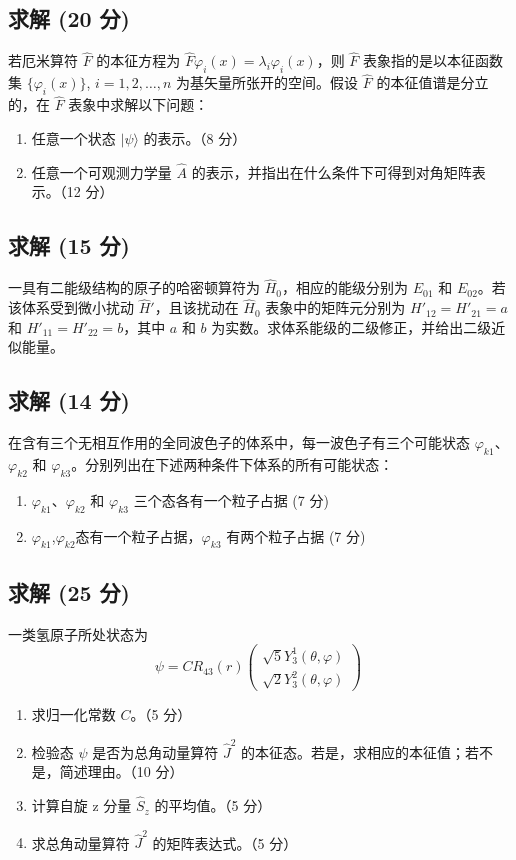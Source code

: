 \subsection{求解 (20 分)}
若厄米算符 $\hat{F}$ 的本征方程为 $\hat{F} \varphi_i(x) = \lambda_i \varphi_i(x)$，则 $\hat{F}$ 表象指的是以本征函数集 $\{\varphi_i(x)\}$, $i=1,2,\dots,n$ 为基矢量所张开的空间。假设 $\hat{F}$ 的本征值谱是分立的，在 $\hat{F}$ 表象中求解以下问题：
\begin{enumerate}
    \item 任意一个状态 $|\psi\rangle$ 的表示。（8 分）
    \item 任意一个可观测力学量 $\hat{A}$ 的表示，并指出在什么条件下可得到对角矩阵表示。（12 分）
\end{enumerate}
\subsection{求解 (15 分)}
一具有二能级结构的原子的哈密顿算符为 $\hat H_0$，相应的能级分别为 $E_{01}$ 和 $E_{02}$。若该体系受到微小扰动 $\hat H'$，且该扰动在 $\hat H_0$ 表象中的矩阵元分别为 $H'_{12} = H'_{21} = a$ 和 $H'_{11} = H'_{22} = b$，其中 $a$ 和 $b$ 为实数。求体系能级的二级修正，并给出二级近似能量。
\subsection{求解 (14 分)}
在含有三个无相互作用的全同波色子的体系中，每一波色子有三个可能状态 $\varphi_{k1}$、$\varphi_{k2}$ 和 $\varphi_{k3}$。分别列出在下述两种条件下体系的所有可能状态：
\begin{enumerate}
    \item $\varphi_{k1}$、$\varphi_{k2}$ 和 $\varphi_{k3}$ 三个态各有一个粒子占据 (7 分)
    \item $\varphi_{k1}$,$\varphi_{k2}$态有一个粒子占据，$\varphi_{k3}$ 有两个粒子占据 (7 分)
\end{enumerate}
\subsection{求解 (25 分)}
一类氢原子所处状态为
\[
\psi = C R_{43}(r) \begin{pmatrix}
\sqrt{5} Y_3^1(\theta, \varphi) \\
\sqrt{2} Y_3^2(\theta, \varphi)
\end{pmatrix}~
\]

\begin{enumerate}
    \item 求归一化常数 $C$。（5 分）
    \item 检验态 $\psi$ 是否为总角动量算符 $\hat{J}^2$ 的本征态。若是，求相应的本征值；若不是，简述理由。（10 分）
    \item 计算自旋 z 分量 $\hat{S}_z$ 的平均值。（5 分）
    \item 求总角动量算符 $\hat{J}^2$ 的矩阵表达式。（5 分）
\end{enumerate}